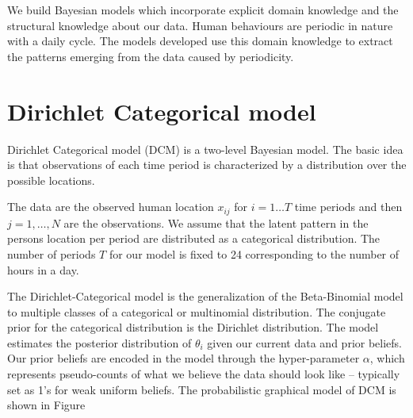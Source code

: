 We build Bayesian models which incorporate explicit domain knowledge and the structural knowledge about our data. Human behaviours are periodic in nature with a daily cycle. The models developed use this domain knowledge to extract the patterns emerging from the data caused by periodicity.

\section{Dirichlet Categorical model }

Dirichlet Categorical model (DCM) is a two-level Bayesian model. The basic idea is that observations of each time period is characterized by a distribution over the possible locations.

The data are the observed human location $x_{ij}$ for $i = 1 \dots T$ time periods and then $j = 1, \dots , N$  are the observations.  We assume that the latent pattern in the persons location per period are distributed as a categorical distribution. The number of periods $T$ for our model is fixed to 24 corresponding to the number of hours in a day. 

The Dirichlet-Categorical model is the generalization of the Beta-Binomial model to multiple classes of a categorical or multinomial distribution. The conjugate prior for the categorical distribution is the Dirichlet distribution. The model estimates the posterior distribution of $\theta_i$ given our current data and prior beliefs. Our prior beliefs are encoded in the model through the hyper-parameter $\alpha$, which represents pseudo-counts of what we believe the data should look like – typically set as 1's for weak uniform beliefs. The probabilistic graphical model of  DCM is shown in Figure \cite{dcm}


